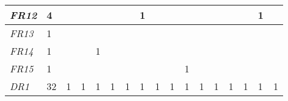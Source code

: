 \begin{table}[]
{\begin{tabular}{|l|l|l|l|l|l|l|l|l|l|l|l|l|l|l|l|l|}
\textit{FR12} & 4                                                     &                                                       &    &                                                       &    &                                                       & 1                                                     &    &    &                                                       &    &                                                  &                                                  &    & 1  &    \\ \hline
\textit{FR13} & 1                                                     &                                                       &    &                                                       &    &                                                       &                                                       &    &    &                                                       &    &                                                  &                                                  &    &    &    \\ \hline
\textit{FR14} & 1                                                     &                                                       &    & 1                                                     &    &                                                       &                                                       &    &    &                                                       &    &                                                  &                                                  &    &    &    \\ \hline
\textit{FR15} & 1                                                     &                                                       &    &                                                       &    &                                                       &                                                       &    &    & 1                                                     &    &                                                  &                                                  &    &    &    \\ \hline
\textit{DR1}  & 32                                                    & 1                                                     & 1  & 1                                                     & 1  & 1                                                     & 1                                                     & 1  & 1  & 1                                                     & 1  & 1                                                & 1                                                & 1  & 1  & 1  \\ \hline

\end{tabular}}
\end{table}
